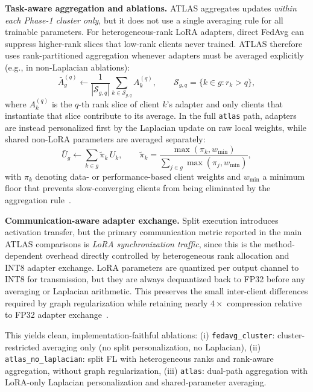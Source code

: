 \documentclass[conference]{IEEEtran}
\begin{document}
\textbf{Task-aware aggregation and ablations.}
ATLAS aggregates updates \emph{within each Phase-1 cluster only}, but it does not use a single averaging rule for all trainable parameters. For heterogeneous-rank LoRA adapters, direct FedAvg can suppress higher-rank slices that low-rank clients never trained. ATLAS therefore uses rank-partitioned aggregation whenever adapters must be averaged explicitly (e.g., in non-Laplacian ablations):
\begin{equation}
\bar{A}_g^{(q)} \leftarrow \frac{1}{|\mathcal{S}_{g,q}|} \sum_{k \in \mathcal{S}_{g,q}} A_k^{(q)},
\qquad
\mathcal{S}_{g,q}=\{k \in g : r_k > q\},
\end{equation}
where $A_k^{(q)}$ is the $q$-th rank slice of client $k$'s adapter and only clients that instantiate that slice contribute to its average. In the full \texttt{atlas} path, adapters are instead personalized first by the Laplacian update on raw local weights, while shared non-LoRA parameters are averaged separately:
\begin{equation}
\bar{U}_g \leftarrow \sum_{k \in g} \tilde{\pi}_k\, U_k,
\qquad
\tilde{\pi}_k = \frac{\max(\pi_k,w_{\min})}{\sum_{j \in g}\max(\pi_j,w_{\min})},
\end{equation}
with $\pi_k$ denoting data- or performance-based client weights and $w_{\min}$ a minimum floor that prevents slow-converging clients from being eliminated by the aggregation rule~\cite{fednova,pfedme}.

\textbf{Communication-aware adapter exchange.}
Split execution introduces activation transfer, but the primary communication metric reported in the main ATLAS comparisons is \emph{LoRA synchronization traffic}, since this is the method-dependent overhead directly controlled by heterogeneous rank allocation and INT8 adapter exchange. LoRA parameters are quantized per output channel to INT8 for transmission, but they are always dequantized back to FP32 before any averaging or Laplacian arithmetic. This preserves the small inter-client differences required by graph regularization while retaining nearly $4\times$ compression relative to FP32 adapter exchange~\cite{llm_int8,qlora,zeroquant,smoothquant}.

This yields clean, implementation-faithful ablations:
(i) \texttt{fedavg\_cluster}: cluster-restricted averaging only (no split personalization, no Laplacian),
(ii) \texttt{atlas\_no\_laplacian}: split FL with heterogeneous ranks and rank-aware aggregation, without graph regularization,
(iii) \texttt{atlas}: dual-path aggregation with LoRA-only Laplacian personalization and shared-parameter averaging.
\end{document}
